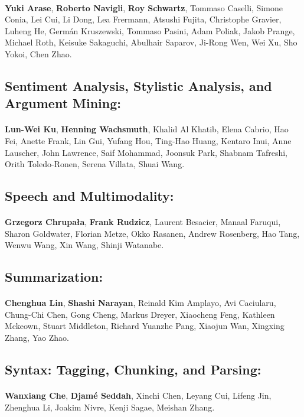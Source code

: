\paragraph{}\textbf{Yuki Arase}, \textbf{Roberto Navigli}, \textbf{Roy Schwartz}, Tommaso Caselli, Simone Conia, Lei Cui, Li Dong, Lea Frermann, Atsushi Fujita, Christophe Gravier, Luheng He, Germán Kruszewski, Tommaso Pasini, Adam Poliak, Jakob Prange, Michael Roth, Keisuke Sakaguchi, Abulhair Saparov, Ji-Rong Wen, Wei Xu, Sho Yokoi, Chen Zhao.
\subsection*{Sentiment Analysis, Stylistic Analysis, and Argument Mining:}
\paragraph{}\textbf{Lun-Wei Ku}, \textbf{Henning Wachsmuth}, Khalid Al Khatib, Elena Cabrio, Hao Fei, Anette Frank, Lin Gui, Yufang Hou, Ting-Hao Huang, Kentaro Inui, Anne Lauscher, John Lawrence, Saif Mohammad, Joonsuk Park, Shabnam Tafreshi, Orith Toledo-Ronen, Serena Villata, Shuai Wang.
\subsection*{Speech and Multimodality:}
\paragraph{}\textbf{Grzegorz Chrupała}, \textbf{Frank Rudzicz}, Laurent Besacier, Manaal Faruqui, Sharon Goldwater, Florian Metze, Okko Rasanen, Andrew Rosenberg, Hao Tang, Wenwu Wang, Xin Wang, Shinji Watanabe.
\subsection*{Summarization:}
\paragraph{}\textbf{Chenghua Lin}, \textbf{Shashi Narayan}, Reinald Kim Amplayo, Avi Caciularu, Chung-Chi Chen, Gong Cheng, Markus Dreyer, Xiaocheng Feng, Kathleen Mckeown, Stuart Middleton, Richard Yuanzhe Pang, Xiaojun Wan, Xingxing Zhang, Yao Zhao.
\subsection*{Syntax: Tagging, Chunking, and Parsing:}
\paragraph{}\textbf{Wanxiang Che}, \textbf{Djamé Seddah}, Xinchi Chen, Leyang Cui, Lifeng Jin, Zhenghua Li, Joakim Nivre, Kenji Sagae, Meishan Zhang.
